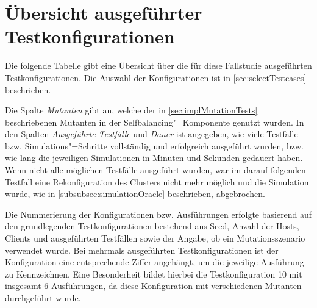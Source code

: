 \chapter{Übersicht ausgeführter Testkonfigurationen}
\label{app:overviewExecutedTestCases}

Die folgende Tabelle gibt eine Übersicht über die für diese Fallstudie ausgeführten Testkonfigurationen.
Die Auswahl der Konfigurationen ist in \cref{sec:selectTestcases} beschrieben.

Die Spalte \emph{Mutanten} gibt an, welche der in \cref{sec:implMutationTests} beschriebenen Mutanten in der Selfbalancing"=Komponente genutzt wurden.
In den Spalten \emph{Ausgeführte Testfälle} und \emph{Dauer} ist angegeben, wie viele Testfälle bzw. Simulations"=Schritte vollständig und erfolgreich ausgeführt wurden, bzw. wie lang die jeweiligen Simulationen in Minuten und Sekunden gedauert haben.
Wenn nicht alle möglichen Testfälle ausgeführt wurden, war im darauf folgenden Testfall eine Rekonfiguration des Clusters nicht mehr möglich und die Simulation wurde, wie in \cref{subsubsec:simulationOracle} beschrieben, abgebrochen.

Die Nummerierung der Konfigurationen bzw. Ausführungen erfolgte basierend auf den grundlegenden Testkonfigurationen bestehend aus Seed, Anzahl der Hosts, Clients und ausgeführten Testfällen sowie der Angabe, ob ein Mutationsszenario verwendet wurde.
Bei mehrmals ausgeführten Testkonfigurationen ist der Konfiguration eine entsprechende Ziffer angehängt, um die jeweilige Ausführung zu Kennzeichnen.
Eine Besonderheit bildet hierbei die Testkonfiguration 10 mit insgesamt 6 Ausführungen, da diese Konfiguration mit verschiedenen Mutanten durchgeführt wurde.

